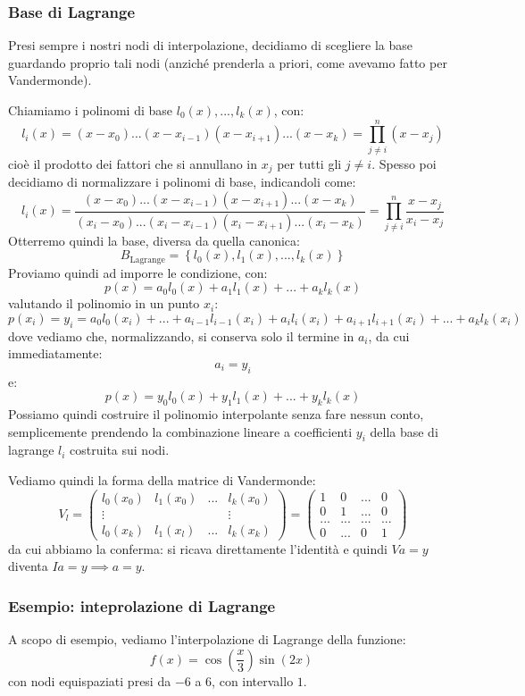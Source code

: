 \documentclass[a4paper,11pt]{article}
\begin{document}
\subsubsection{Base di Lagrange}
Presi sempre i nostri nodi di interpolazione, decidiamo di scegliere la base guardando proprio tali nodi (anziché prenderla a priori, come avevamo fatto per Vandermonde).

Chiamiamo i polinomi di base $l_0(x), ..., l_k(x)$, con:
$$
l_i(x) = (x - x_0) ... (x - x_{i - 1}) (x - x_{i + 1}) ... (x - x_k) = \prod_{j \neq i}^n (x - x_j)
$$
cioè il prodotto dei fattori che si annullano in $x_j$ per tutti gli $j \neq i$.
Spesso poi decidiamo di normalizzare i polinomi di base, indicandoli come:
$$
l_i(x) = \frac{(x - x_0) ... (x - x_{i - 1}) (x - x_{i + 1}) ... (x - x_k)}{(x_i - x_0) ... (x_i - x_{i - 1}) (x_i - x_{i + 1}) ... (x_i - x_k)} = \prod_{j \neq i}^n \frac{x - x_j}{x_i - x_j} 
$$
Otterremo quindi la base, diversa da quella canonica:
$$
B_\text{Lagrange} = \left\{ l_0(x), l_1(x), ..., l_k(x) \right\}
$$
Proviamo quindi ad imporre le condizione, con:
$$
p(x) = a_0 l_0(x) + a_1 l_1(x) + ... + a_k l_k(x)
$$
valutando il polinomio in un punto $x_i$:
$$
p(x_i) = y_i = a_0 l_0(x_i) + ... + a_{i - 1} l_{i - 1}(x_i) + a_i l_i(x_i) + a_{i + 1} l_{i + 1}(x_i) + ... + a_k l_k(x_i)
$$
dove vediamo che, normalizzando, si conserva solo il termine in $a_i$, da cui immediatamente:
$$
a_i = y_i
$$
e:
$$
p(x) = y_0 l_0(x) + y_1 l_1(x) + ... + y_k l_k(x)
$$
Possiamo quindi costruire il polinomio interpolante senza fare nessun conto, semplicemente prendendo la combinazione lineare a coefficienti $y_i$ della base di lagrange $l_i$ costruita sui nodi.

Vediamo quindi la forma della matrice di Vandermonde:
$$
V_l =
\begin{pmatrix}
	l_0(x_0) & l_1(x_0) & ... & l_k(x_0) \\ 
	\vdots & & & \vdots \\
	l_0(x_k) & l_1(x_l) & ... & l_k(x_k)
\end{pmatrix} = 
\begin{pmatrix}
	1 & 0 & ... & 0 \\
	0 & 1 & ... & 0 \\
	... & ... & ... & ... \\
	0 & ... & 0 & 1
\end{pmatrix}
$$
da cui abbiamo la conferma: si ricava direttamente l'identità e quindi $Va = y$ diventa $I a = y \implies a = y$.

\subsubsection{Esempio: inteprolazione di Lagrange}
A scopo di esempio, vediamo l'interpolazione di Lagrange della funzione:
$$
f\left(x\right)=\cos\left(\frac{x}{3}\right)\sin\left(2x\right)\ 
$$
con nodi equispaziati presi da $-6$ a $6$, con intervallo $1$.
\end{document}

